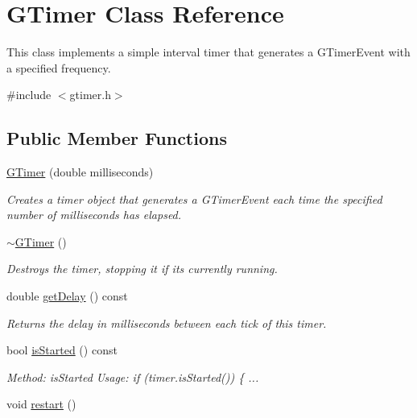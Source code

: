 \hypertarget{classsgl_1_1GTimer}{}\section{G\+Timer Class Reference}
\label{classsgl_1_1GTimer}


This class implements a simple interval timer that generates a {\ttfamily G\+Timer\+Event} with a specified frequency.  




{\ttfamily \#include $<$gtimer.\+h$>$}

\subsection*{Public Member Functions}
\begin{DoxyCompactItemize}
\item 
\mbox{\hyperlink{classsgl_1_1GTimer_ab947e096ce76b63f283502e4b4446810}{G\+Timer}} (double milliseconds)
\begin{DoxyCompactList}\small\item\em Creates a timer object that generates a {\ttfamily G\+Timer\+Event} each time the specified number of milliseconds has elapsed. \end{DoxyCompactList}\item 
\mbox{\hyperlink{classsgl_1_1GTimer_a2f693771957cae3efd9bfc952c543961}{$\sim$\+G\+Timer}} ()
\begin{DoxyCompactList}\small\item\em Destroys the timer, stopping it if it\textquotesingle{}s currently running. \end{DoxyCompactList}\item 
double \mbox{\hyperlink{classsgl_1_1GTimer_a73d6fbcedb3f4c8379a76161503dc8f8}{get\+Delay}} () const
\begin{DoxyCompactList}\small\item\em Returns the delay in milliseconds between each tick of this timer. \end{DoxyCompactList}\item 
bool \mbox{\hyperlink{classsgl_1_1GTimer_ac1991ea0e286fbb461b60c8c9299d781}{is\+Started}} () const
\begin{DoxyCompactList}\small\item\em Method\+: is\+Started Usage\+: if (timer.\+is\+Started()) \{ ... \end{DoxyCompactList}\item 
void \mbox{\hyperlink{classsgl_1_1GTimer_a22ee094ca3f45aa4156b97d34fe678bf}{restart}} ()

\end{DoxyCompactItemize}
